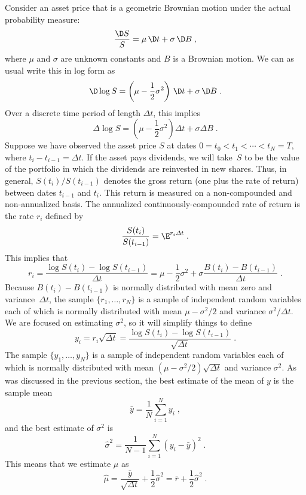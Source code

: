 Consider an asset price that is a geometric Brownian motion under the actual probability measure:
$$\frac{\D S}{S} = \mu\,\D t + \sigma\,\D B\; ,$$
where $\mu$ and $\sigma$ are unknown constants and $B$ is a Brownian motion.  We can as usual write this in log form as
$$\D\log S = \left(\mu-\frac{1}{2}\sigma^2\right)\,\D t + \sigma\,\D B\; .$$
Over a discrete time period of length $\varDelta t$, this implies
\begin{equation}\label{dlogs}
\varDelta \log S = \left(\mu-\frac{1}{2}\sigma^2\right)\varDelta t + \sigma \varDelta B\;.
\end{equation}
Suppose we have observed the asset price $S$ at dates $0=t_0<t_1<\cdots< t_N=T$, where $t_i-t_{i-1}=\varDelta t$.  If the asset pays dividends, we will take~$S$ to be the value of the portfolio in which the dividends are reinvested in new shares.  Thus, in general, $S(t_i)/S(t_{i-1})$ denotes the gross return (one plus the rate of return) between dates $t_{i-1}$ and $t_i$.  This return is measured on a non-compounded and non-annualized basis.  The annualized continuously-compounded rate of return is the rate $r_i$ defined by 
$$\frac{S(t_i)}{S(t_{i-1})} = \E^{r_i\varDelta t}\; .$$
This implies that
\begin{equation}\label{contcompreturn}
r_i = \frac{\log S(t_i)-\log S(t_{i-1})}{\varDelta t} = \mu-\frac{1}{2}\sigma^2 + \sigma \frac{B(t_i)-B(t_{i-1})}{\varDelta t}\;.
\end{equation}
Because $B(t_i)-B(t_{i-1})$ is normally distributed with mean zero and variance~$\varDelta t$, the sample $\{r_1,\ldots,r_N\}$ is a sample of independent random variables each of which is normally distributed with mean $\mu-\sigma^2/2$ and variance $\sigma^2/\varDelta t$.  We are focused on estimating $\sigma^2$, so it will simplify things to define
\begin{equation}\label{volyi}
y_i = r_i\sqrt{\varDelta t} = \frac{\log S(t_i)-\log S(t_{i-1})}{\sqrt{\varDelta t}}\;.
\end{equation}
The sample $\{y_1,\ldots,y_N\}$ is a sample of independent random variables each of which is normally distributed with mean $(\mu-\sigma^2/2)\sqrt{\varDelta t}$ and variance $\sigma^2$.
As was discussed in the previous section, the best estimate of the mean of $y$ is the sample mean
$$\bar{y} = \frac{1}{N}\sum_{i=1}^{N}y_i\; ,$$
and the best estimate of $\sigma^2$ is
$$\hat{\sigma}^2 = \frac{1}{N-1}\sum_{i=1}^{N} (y_i-\bar{y})^2\; .$$
This means that we estimate $\mu$ as
$$\hat{\mu} = \frac{\bar{y}}{\sqrt{\varDelta t}} + \frac{1}{2}\hat{\sigma}^2 = \bar{r}+ \frac{1}{2}\hat{\sigma}^2\; .$$ 

